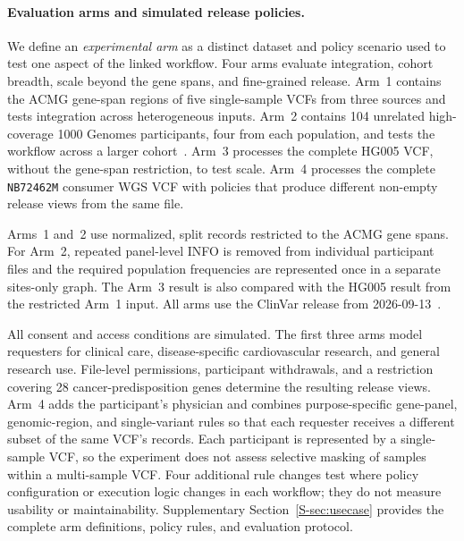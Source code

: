 \documentclass[pdflatex,sn-mathphys-num]{sn-jnl}
\begin{document}
\paragraph{Evaluation arms and simulated release policies.}
We define an \emph{experimental arm} as a distinct dataset and policy scenario used to test one aspect of the linked workflow.
Four arms evaluate integration, cohort breadth, scale beyond the gene spans, and fine-grained release.
Arm~1 contains the ACMG gene-span regions of five single-sample VCFs from three sources and tests integration across heterogeneous inputs.
Arm~2 contains 104 unrelated high-coverage 1000 Genomes participants, four from each population, and tests the workflow across a larger cohort~\cite{byrska2022highcoverage}.
Arm~3 processes the complete HG005 VCF, without the gene-span restriction, to test scale.
Arm~4 processes the complete \texttt{NB72462M} consumer WGS VCF with policies that produce different non-empty release views from the same file.

Arms~1 and~2 use normalized, split records restricted to the ACMG gene spans.
For Arm~2, repeated panel-level INFO is removed from individual participant files and the required population frequencies are represented once in a separate sites-only graph.
The Arm~3 result is also compared with the HG005 result from the restricted Arm~1 input.
All arms use the ClinVar release from 2026-09-13~\cite{clinvar_vcf}.

All consent and access conditions are simulated.
The first three arms model requesters for clinical care, disease-specific cardiovascular research, and general research use.
File-level permissions, participant withdrawals, and a restriction covering 28 cancer-predisposition genes determine the resulting release views.
Arm~4 adds the participant's physician and combines purpose-specific gene-panel, genomic-region, and single-variant rules so that each requester receives a different subset of the same VCF's records.
Each participant is represented by a single-sample VCF, so the experiment does not assess selective masking of samples within a multi-sample VCF.
Four additional rule changes test where policy configuration or execution logic changes in each workflow; they do not measure usability or maintainability.
Supplementary Section~\ref{S-sec:usecase} provides the complete arm definitions, policy rules, and evaluation protocol.
\end{document}
